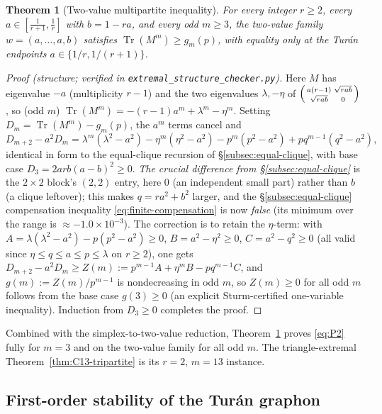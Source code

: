 \documentclass[11pt]{article}
\newtheorem{theorem}{Theorem}[section]
\newcommand{\Tr}{\operatorname{Tr}}
\begin{document}
\begin{theorem}[Two-value multipartite inequality]\label{thm:two-value}
For every integer $r\ge2$, every $a\in[\tfrac1{r+1},\tfrac1r]$ with $b=1-ra$, and every odd $m\ge3$, the two-value family $w=(a,\dots,a,b)$ satisfies $\Tr(M^m)\ge g_m(p)$, with equality only at the Tur\'an endpoints $a\in\{1/r,1/(r+1)\}$.
\end{theorem}

\begin{proof}[Proof (structure; verified in \texttt{extremal\_structure\_checker.py})]
Here $M$ has eigenvalue $-a$ (multiplicity $r-1$) and the two eigenvalues $\lambda,-\eta$ of $\begin{psmallmatrix}a(r-1)&\sqrt{rab}\\\sqrt{rab}&0\end{psmallmatrix}$, so (odd $m$) $\Tr(M^m)=-(r-1)a^m+\lambda^m-\eta^m$.  Setting $D_m=\Tr(M^m)-g_m(p)$, the $a^m$ terms cancel and
\[
        D_{m+2}-a^2D_m=\lambda^m(\lambda^2-a^2)-\eta^m(\eta^2-a^2)-p^m(p^2-a^2)+pq^{m-1}(q^2-a^2),
\]
identical in form to the equal-clique recursion of \S\ref{subsec:equal-clique}, with base case $D_3=2arb(a-b)^2\ge0$.  \emph{The crucial difference from \S\ref{subsec:equal-clique}} is the $2\times2$ block's $(2,2)$ entry, here $0$ (an independent small part) rather than $b$ (a clique leftover); this makes $q=ra^2+b^2$ larger, and the \S\ref{subsec:equal-clique} compensation inequality \eqref{eq:finite-compensation} is now \emph{false} (its minimum over the range is $\approx-1.0\times10^{-3}$).  The correction is to retain the $\eta$-term: with $A=\lambda(\lambda^2-a^2)-p(p^2-a^2)\ge0$, $B=a^2-\eta^2\ge0$, $C=a^2-q^2\ge0$ (all valid since $\eta\le q\le a\le p\le\lambda$ on $r\ge2$), one gets $D_{m+2}-a^2D_m\ge Z(m):=p^{m-1}A+\eta^mB-pq^{m-1}C$, and $g(m):=Z(m)/p^{m-1}$ is nondecreasing in odd $m$, so $Z(m)\ge0$ for all odd $m$ follows from the base case $g(3)\ge0$ (an explicit Sturm-certified one-variable inequality).  Induction from $D_3\ge0$ completes the proof.
\end{proof}

\noindent Combined with the simplex-to-two-value reduction, Theorem~\ref{thm:two-value} proves \eqref{eq:P2} fully for $m=3$ and on the two-value family for all odd $m$.  The triangle-extremal Theorem~\ref{thm:C13-tripartite} is its $r=2$, $m=13$ instance.

\subsection{First-order stability of the Tur\'an graphon}
\end{document}
